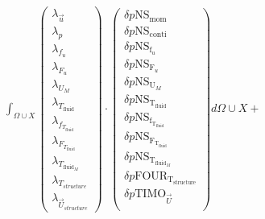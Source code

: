 \documentclass[10pt]{article} %
\begin{document}
\begin{center}
	$\int_{\Omega \cup X}
	\begin{pmatrix}
		\lambda_{\vec{u}} \\ \lambda_p \\ \lambda_{f_u} \\ \lambda_{F_u} \\ \lambda_{U_M}\\ \lambda_{T_{\text{fluid}}} \\ \lambda_{f_{T_{\text{fluid}}}} \\ \lambda_{F_{T_{\text{fluid}}}} \\ \lambda_{T_{\text{fluid}_M}} \\ \lambda_{T_{structure}} \\ \lambda_{\vec{U}_{structure}}
	\end{pmatrix}
	\cdot
	\begin{pmatrix}
		\delta p \text{NS}_{\text{mom}} \\
		\delta p \text{NS}_{\text{conti}}\\
		\delta p \text{NS}_{\text{f}_u} \\
		\delta p \text{NS}_{\text{F}_u} \\
		\delta p \text{NS}_{\text{U}_M} \\
		\delta p \text{NS}_{\text{T}_{\text{fluid}}} \\
		\delta p \text{NS}_{\text{f}_{\text{T}_{\text{fluid}}}}\\
		\delta p \text{NS}_{\text{F}_{\text{T}_{\text{fluid}}}}\\
		\delta p \text{NS}_{\text{T}_{\text{fluid}_M}}\\
		\delta p \text{FOUR}_{\text{T}_{\text{structure}}}\\
		\delta p \text{TIMO}_{\vec{U}}\\
	\end{pmatrix}
	d\Omega \cup X + $\\


\end{center}
\end{document}
